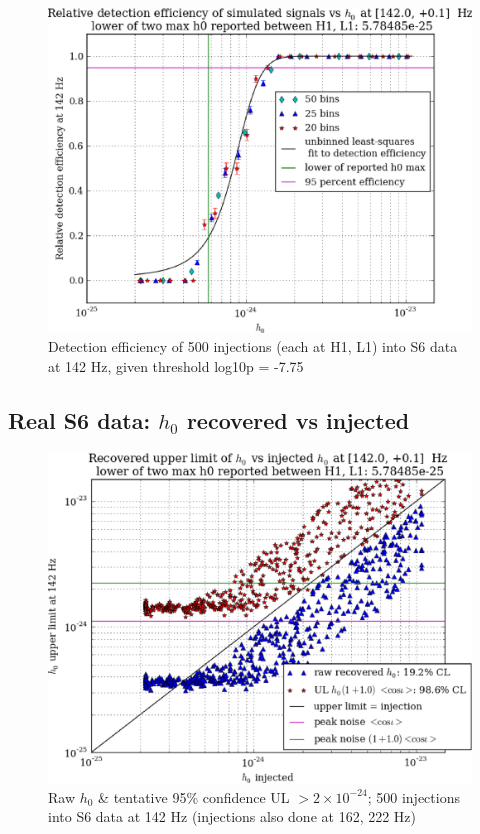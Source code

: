 \begin{figure}
\begin{center}
\includegraphics[width=0.4\paperwidth,height=0.2\paperheight]{plots/detectionEfficiencyh0-142-0Hz.eps}
\caption{Detection efficiency of 500 injections (each at H1, L1) into
S6 data at 142 Hz, given threshold log10p = -7.75}
\end{center}
\end{figure}

        \subsection{Real S6 data: $h_0$ recovered vs injected}

\begin{figure}
\begin{center}
\includegraphics[width=0.4\paperwidth,height=0.2\paperheight]{plots/h0UL-vs-h0injected-142-0Hz.eps}
\caption{
Raw $h_0$ \& tentative 95\% confidence UL $>2\times10^{-24}$; 500 injections
into S6 data at 142 Hz (injections also done at 162, 222 Hz)}
\end{center}
\end{figure}

